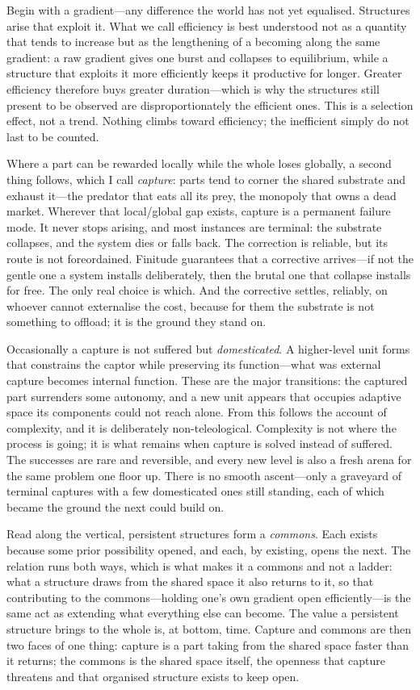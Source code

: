 \documentclass[11pt]{article}
\begin{document}
Begin with a gradient---any difference the world has not yet equalised. Structures arise that exploit it. What we call efficiency is best understood not as a quantity that tends to increase but as the lengthening of a becoming along the same gradient: a raw gradient gives one burst and collapses to equilibrium, while a structure that exploits it more efficiently keeps it productive for longer. Greater efficiency therefore buys greater duration---which is why the structures still present to be observed are disproportionately the efficient ones. This is a selection effect, not a trend. Nothing climbs toward efficiency; the inefficient simply do not last to be counted.

Where a part can be rewarded locally while the whole loses globally, a second thing follows, which I call \emph{capture}: parts tend to corner the shared substrate and exhaust it---the predator that eats all its prey, the monopoly that owns a dead market. Wherever that local/global gap exists, capture is a permanent failure mode. It never stops arising, and most instances are terminal: the substrate collapses, and the system dies or falls back. The correction is reliable, but its route is not foreordained. Finitude guarantees that a corrective arrives---if not the gentle one a system installs deliberately, then the brutal one that collapse installs for free. The only real choice is which. And the corrective settles, reliably, on whoever cannot externalise the cost, because for them the substrate is not something to offload; it is the ground they stand on.

Occasionally a capture is not suffered but \emph{domesticated}. A higher-level unit forms that constrains the captor while preserving its function---what was external capture becomes internal function. These are the major transitions: the captured part surrenders some autonomy, and a new unit appears that occupies adaptive space its components could not reach alone. From this follows the account of complexity, and it is deliberately non-teleological. Complexity is not where the process is going; it is what remains when capture is solved instead of suffered. The successes are rare and reversible, and every new level is also a fresh arena for the same problem one floor up. There is no smooth ascent---only a graveyard of terminal captures with a few domesticated ones still standing, each of which became the ground the next could build on.

Read along the vertical, persistent structures form a \emph{commons}. Each exists because some prior possibility opened, and each, by existing, opens the next. The relation runs both ways, which is what makes it a commons and not a ladder: what a structure draws from the shared space it also returns to it, so that contributing to the commons---holding one's own gradient open efficiently---is the same act as extending what everything else can become. The value a persistent structure brings to the whole is, at bottom, time. Capture and commons are then two faces of one thing: capture is a part taking from the shared space faster than it returns; the commons is the shared space itself, the openness that capture threatens and that organised structure exists to keep open.
\end{document}
